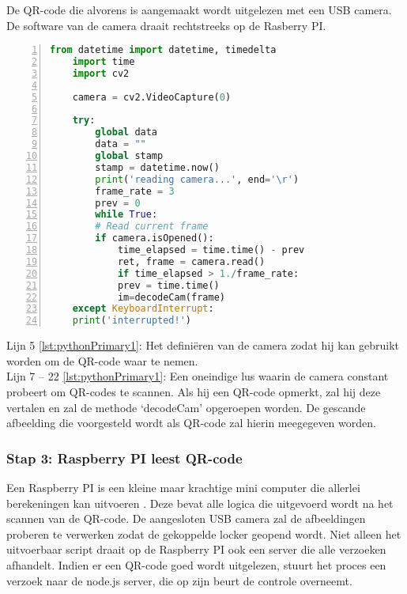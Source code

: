 De QR-code die alvorens is aangemaakt wordt uitgelezen met een USB camera. De software van de camera draait rechtstreeks op de Rasberry PI. 
 \begin{lstlisting}[language=Python, caption={Het uitvoerbare script van de QR-unit, die de toegangscode zal uitlezen.}, label={lst:pythonPrimary1}, numbers=left]
    from datetime import datetime, timedelta
    import time
    import cv2
    
    camera = cv2.VideoCapture(0)
    
    try:
        global data
        data = ""
        global stamp
        stamp = datetime.now()
        print('reading camera...', end='\r')
        frame_rate = 3
        prev = 0
        while True:
        # Read current frame
        if camera.isOpened():
            time_elapsed = time.time() - prev
            ret, frame = camera.read()
            if time_elapsed > 1./frame_rate:
            prev = time.time()
            im=decodeCam(frame)
    except KeyboardInterrupt:
    print('interrupted!')
\end{lstlisting}
Lijn 5 \ref{lst:pythonPrimary1}: Het definiëren van de camera zodat hij kan gebruikt worden om de QR-code waar te nemen. \\    
Lijn 7 – 22 \ref{lst:pythonPrimary1}: Een oneindige lus waarin de camera constant probeert om QR-codes te scannen. Als hij een QR-code opmerkt, zal hij deze vertalen en zal de methode ‘decodeCam’ opgeroepen worden. De gescande afbeelding die voorgesteld wordt als QR-code zal hierin meegegeven worden.\\

\subsubsection{Stap 3: Raspberry PI leest QR-code}
Een Raspberry PI is een kleine maar krachtige mini computer die allerlei berekeningen kan uitvoeren \autocite{Richardson2013}. Deze bevat alle logica die uitgevoerd wordt na het scannen van de QR-code.  De aangesloten USB camera zal de afbeeldingen proberen te verwerken zodat de gekoppelde locker geopend wordt. Niet alleen het uitvoerbaar script draait op de Raspberry PI ook een server die alle verzoeken afhandelt. Indien er een QR-code goed wordt uitgelezen, stuurt het proces een verzoek naar de node.js server, die op zijn beurt de controle overneemt.

